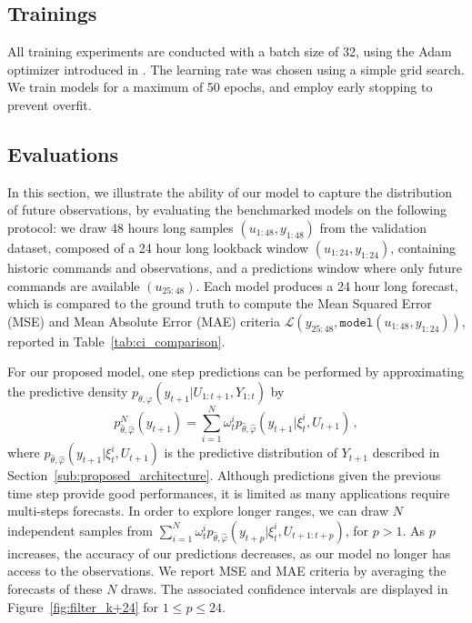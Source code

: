 \documentclass[journal]{IEEEtran}
\begin{document}
\subsection{Trainings}
\label{sub:trainings}
All training experiments are conducted with a batch size of 32, using the Adam optimizer introduced in \cite{Kingma2015AdamAM}.
The learning rate was chosen using a simple grid search.
We train models for a maximum of 50 epochs, and employ early stopping to prevent overfit.

\subsection{Evaluations}%
\label{sub:evaluations}

In this section, we illustrate the ability of our model to capture the distribution of future observations, by evaluating the benchmarked models on the following protocol:
we draw 48 hours long samples $(u_{1:48}, y_{1:48})$ from the validation dataset, composed of a 24 hour long lookback window $(u_{1:24}, y_{1:24})$, containing historic commands and observations, and a predictions window where only future commands are available $(u_{25:48})$.
Each model produces a 24 hour long forecast, which is compared to the ground truth to compute the Mean Squared Error (MSE) and Mean Absolute Error (MAE) criteria $\mathcal{L}(y_{25:48}, \texttt{model}(u_{1:48}, y_{1:24}))$, reported in Table~\ref{tab:ci_comparison}.

For our proposed model, one step predictions can be performed by approximating the predictive density $p_{\theta,\varphi}(y_{t+1}|U_{1:t+1},Y_{1:t})$ by
$$
	p^N_{\widehat\theta,\widehat\varphi}(y_{t+1})= \sum_{i=1}^{N}\omega_t^i p_{\widehat\theta,\widehat\varphi}(y_{t+1}|\xi_t^i,U_{t+1})\,,
$$
where $ p_{\widehat\theta,\widehat\varphi}(y_{t+1}|\xi_t^i,U_{t+1})$ is the predictive distribution of $Y_{t+1}$ described in Section~\ref{sub:proposed_architecture}.
Although predictions given the previous time step provide good performances, it is limited as many applications require multi-steps forecasts.
In order to explore longer ranges, we can draw $N$ independent samples from $\sum_{i=1}^{N}\omega_t^i p_{\widehat\theta,\widehat\varphi}(y_{t+p}|\xi_t^i,U_{t+1:t+p})$, for $p>1$.
As $p$ increases, the accuracy of our predictions decreases, as our model no longer has access to the observations.
We report MSE and MAE criteria by averaging the forecasts of these $N$ draws.
The associated confidence intervals are displayed in Figure~\ref{fig:filter_k+24} for $1\leq p \leq 24$.
\end{document}
